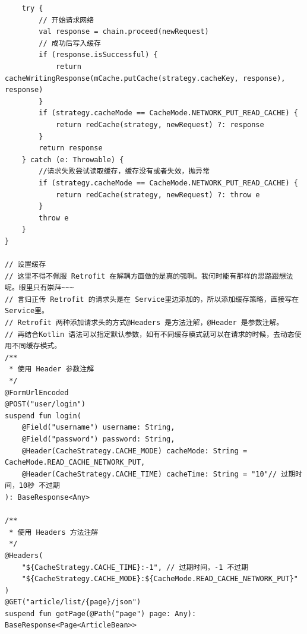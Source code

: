 \documentclass[9pt, b5paper]{article}
\begin{document}
\begin{verbatim}
    try {
        // 开始请求网络
        val response = chain.proceed(newRequest)
        // 成功后写入缓存
        if (response.isSuccessful) {
            return cacheWritingResponse(mCache.putCache(strategy.cacheKey, response), response)
        }
        if (strategy.cacheMode == CacheMode.NETWORK_PUT_READ_CACHE) {
            return redCache(strategy, newRequest) ?: response
        }
        return response
    } catch (e: Throwable) {
        //请求失败尝试读取缓存，缓存没有或者失效，抛异常
        if (strategy.cacheMode == CacheMode.NETWORK_PUT_READ_CACHE) {
            return redCache(strategy, newRequest) ?: throw e
        }
        throw e
    }
}

// 设置缓存
// 这里不得不佩服 Retrofit 在解耦方面做的是真的强啊。我何时能有那样的思路跟想法呢。眼里只有崇拜~~~
// 言归正传 Retrofit 的请求头是在 Service里边添加的，所以添加缓存策略，直接写在Service里。
// Retrofit 两种添加请求头的方式@Headers 是方法注解，@Header 是参数注解。
// 再结合Kotlin 语法可以指定默认参数，如有不同缓存模式就可以在请求的时候，去动态使用不同缓存模式。
/**
 * 使用 Header 参数注解
 */
@FormUrlEncoded
@POST("user/login")
suspend fun login(
    @Field("username") username: String,
    @Field("password") password: String,
    @Header(CacheStrategy.CACHE_MODE) cacheMode: String = CacheMode.READ_CACHE_NETWORK_PUT,
    @Header(CacheStrategy.CACHE_TIME) cacheTime: String = "10"// 过期时间，10秒 不过期
): BaseResponse<Any>

/**
 * 使用 Headers 方法注解
 */
@Headers(
    "${CacheStrategy.CACHE_TIME}:-1", // 过期时间，-1 不过期
    "${CacheStrategy.CACHE_MODE}:${CacheMode.READ_CACHE_NETWORK_PUT}"
)
@GET("article/list/{page}/json")
suspend fun getPage(@Path("page") page: Any): BaseResponse<Page<ArticleBean>>


\end{verbatim}
\end{document}
